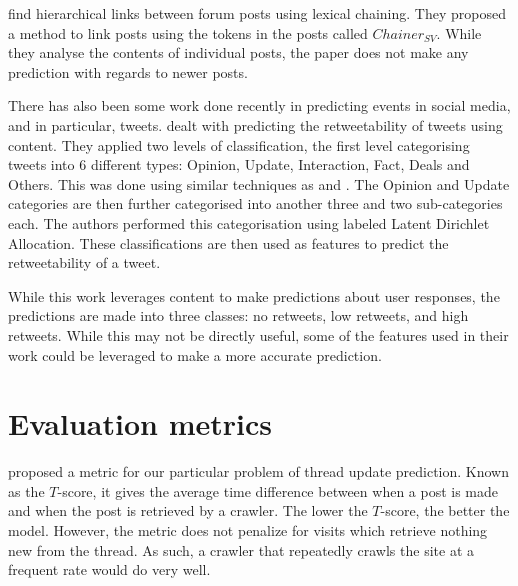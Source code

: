  find hierarchical links between forum posts using lexical 
chaining.  They proposed a method to link posts using the tokens in the posts 
called $Chainer_{SV}$. While they analyse the contents of individual posts, the 
paper does not make any prediction with regards to newer posts.

There has also been some work done recently in predicting events in social 
media, and in particular, tweets.   dealt with predicting the 
retweetability of tweets using content. They applied two levels of 
classification, the first level categorising tweets into 6 different types: 
Opinion, Update, Interaction, Fact, Deals and Others. This was done using 
similar techniques as  and . The Opinion 
and Update categories are then further categorised into another three and two 
sub-categories each. The authors performed this categorisation using labeled 
Latent Dirichlet Allocation. These classifications are then used as features to 
predict the retweetability of a tweet. 

While this work leverages content to make predictions about user responses, the 
predictions are made into three classes: no retweets, low retweets, and high 
retweets. While this may not be directly useful, some of the features used in 
their work could be leveraged to make a more accurate prediction.





\section{Evaluation metrics}
 proposed a metric for our particular problem of thread update 
prediction. Known as the $T$-score, it gives the average time difference between 
when a post is made and when the post is retrieved by a crawler. The lower the 
$T$-score, the better the model. However, the metric does not penalize for 
visits which retrieve nothing new from the thread.  As such, a crawler that 
repeatedly crawls the site at a frequent rate would do very well.

